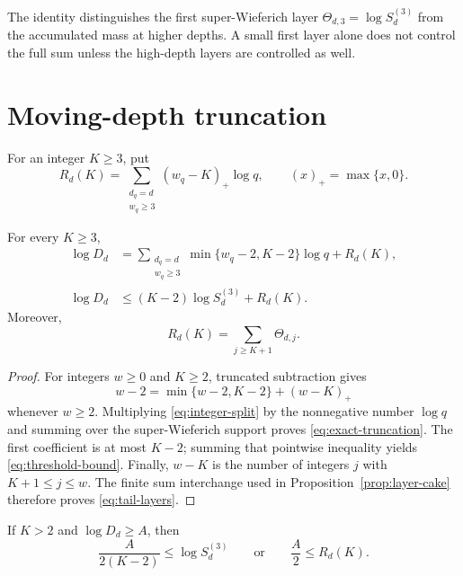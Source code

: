 The identity distinguishes the first super-Wieferich layer
$\Theta_{d,3}=\log S_d^{(3)}$ from the accumulated mass at higher depths.
A small first layer alone does not control the full sum unless the
high-depth layers are controlled as well.

\section{Moving-depth truncation}
\label{sec:truncation}

For an integer $K\ge3$, put
\begin{equation}
 R_d(K)=\sum_{\substack{d_q=d\\w_q\ge3}}
             (w_q-K)_+\log q,
 \qquad (x)_+=\max\{x,0\}.
 \label{eq:tail-definition}
\end{equation}

\begin{proposition}
\label{prop:truncation}
For every $K\ge3$,
\begin{align}
 \log D_d
 &=\sum_{\substack{d_q=d\\w_q\ge3}}
      \min\{w_q-2,K-2\}\log q+R_d(K),
 \label{eq:exact-truncation}\\
 \log D_d
 &\le (K-2)\log S_d^{(3)}+R_d(K).
 \label{eq:threshold-bound}
\end{align}
Moreover,
\begin{equation}
                    R_d(K)=\sum_{j\ge K+1}\Theta_{d,j}.
 \label{eq:tail-layers}
\end{equation}
\end{proposition}

\begin{proof}
For integers $w\ge0$ and $K\ge2$, truncated subtraction gives
\begin{equation}
 w-2=\min\{w-2,K-2\}+(w-K)_+
 \label{eq:integer-split}
\end{equation}
whenever $w\ge2$.  Multiplying \eqref{eq:integer-split} by the nonnegative
number $\log q$ and summing over the super-Wieferich support proves
\eqref{eq:exact-truncation}.  The first coefficient is at most $K-2$;
summing that pointwise inequality yields \eqref{eq:threshold-bound}.
Finally, $w-K$ is the number of integers $j$ with $K+1\le j\le w$.
The finite sum interchange used in Proposition~\ref{prop:layer-cake}
therefore proves \eqref{eq:tail-layers}.
\end{proof}

\begin{corollary}
\label{cor:dichotomy}
If $K>2$ and $\log D_d\ge A$, then
\begin{equation}
 \frac{A}{2(K-2)}\le\log S_d^{(3)}
 \qquad\text{or}\qquad
 \frac A2\le R_d(K).
 \label{eq:dichotomy}
\end{equation}
\end{corollary}

